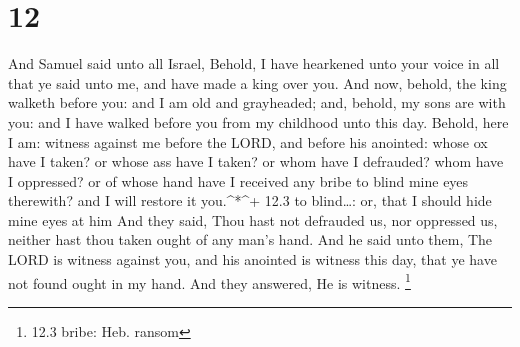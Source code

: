 \hypertarget{section-11}{%
\section{12}\label{section-11}}

 And Samuel said unto all Israel, Behold, I have hearkened
unto your voice in all that ye said unto me, and have made a king over
you.  And now, behold, the king walketh before you: and I am
old and grayheaded; and, behold, my sons are with you: and I have walked
before you from my childhood unto this day.  Behold, here I
am: witness against me before the LORD, and before his anointed: whose
ox have I taken? or whose ass have I taken? or whom have I defrauded?
whom have I oppressed? or of whose hand have I received any bribe to
blind mine eyes therewith? and I will restore it you.\^{}*\^{}+ 12.3 to
blind\ldots: or, that I should hide mine eyes at him  And
they said, Thou hast not defrauded us, nor oppressed us, neither hast
thou taken ought of any man's hand.  And he said unto them,
The LORD is witness against you, and his anointed is witness this day,
that ye have not found ought in my hand. And they answered, He is
witness. \footnote{12.3 bribe: Heb. ransom}

